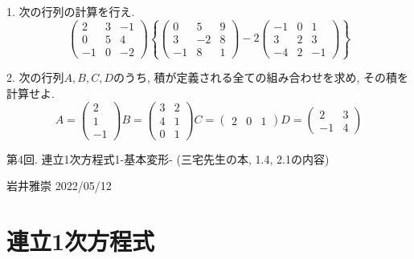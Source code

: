 \documentclass[dvipdfmx,a4paper,11pt]{article}
\theoremstyle{definition}
\begin{document}
1.  次の行列の計算を行え.
 $$
 \begin{pmatrix}
 2 &3&-1 \\
 0&5&4\\
 -1&0&-2
 \end{pmatrix}
 \left\{
 \begin{pmatrix}
 0 &5&9 \\
 3&-2&8\\
 -1&8&1
 \end{pmatrix}
 - 2
  \begin{pmatrix}
 -1 &0&1 \\
 3&2&3\\
 -4&2&-1
 \end{pmatrix}
\right\}
 $$
  
 2. 次の行列$A,B,C,D$のうち, 積が定義される全ての組み合わせを求め, その積を計算せよ.
 $$
  A=\begin{pmatrix}
 2 \\ 1\\-1
 \end{pmatrix} 
B= \begin{pmatrix}
 3 &2\\
 4&1\\
 0&1
 \end{pmatrix} 
 C=
  \begin{pmatrix}
 2 &0&1 
 \end{pmatrix}
 D= \begin{pmatrix}
 2&3\\
 -1&4
 \end{pmatrix}
 $$

\newpage

\begin{center}
{\Large 第4回. 連立1次方程式1-基本変形- (三宅先生の本, 1.4, 2.1の内容)}
\end{center}

\begin{flushright}
 岩井雅崇 2022/05/12
\end{flushright}

\section{連立1次方程式}
\end{document}
